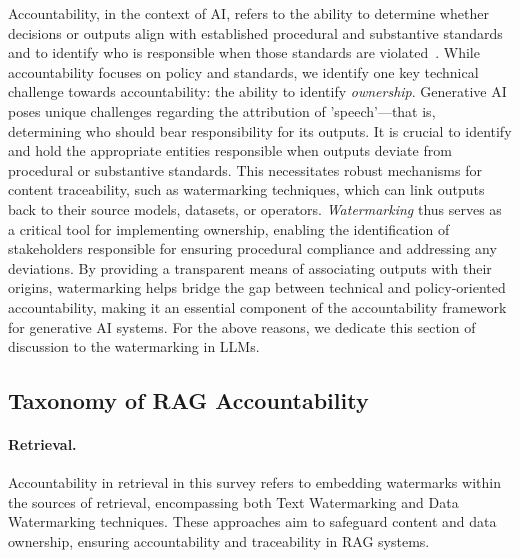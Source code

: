 Accountability, in the context of AI, refers to the ability to determine whether decisions or outputs align with established procedural and substantive standards and to identify who is responsible when those standards are violated~\cite{doshi2017accountability}. While accountability focuses on policy and standards, we identify one key technical challenge towards accountability: the ability to identify \textit{ownership}. Generative AI poses unique challenges regarding the attribution of 'speech'—that is, determining who should bear responsibility for its outputs. It is crucial to identify and hold the appropriate entities responsible when outputs deviate from procedural or substantive standards. This necessitates robust mechanisms for content traceability, such as watermarking techniques, which can link outputs back to their source models, datasets, or operators.
\textit{Watermarking} thus serves as a critical tool for implementing ownership, enabling the identification of stakeholders responsible for ensuring procedural compliance and addressing any deviations. By providing a transparent means of associating outputs with their origins, watermarking helps bridge the gap between technical and policy-oriented accountability, making it an essential component of the accountability framework for generative AI systems. For the above reasons, we dedicate this section of discussion to the watermarking in LLMs. 

\subsection{Taxonomy of RAG Accountability}

\paragraph{Retrieval.}
Accountability in retrieval in this survey refers to embedding watermarks within the sources of retrieval, encompassing both Text Watermarking and Data Watermarking techniques. These approaches aim to safeguard content and data ownership, ensuring accountability and traceability in RAG systems.

